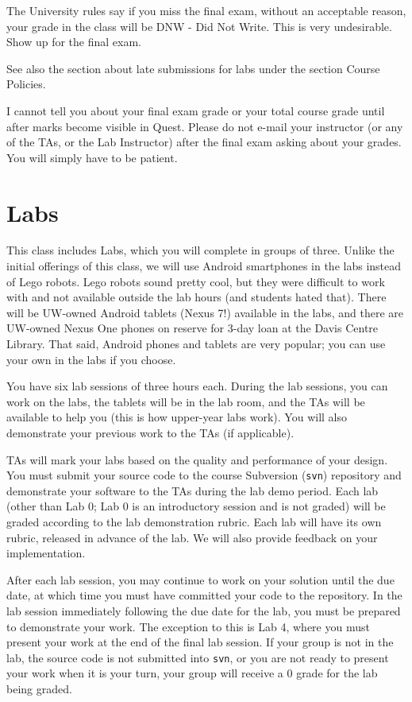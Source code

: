 \documentclass[letterpaper,10pt]{article}
\begin{document}
The University rules say if you miss the final exam, without an acceptable reason, your grade in the class will be DNW - Did Not Write. This is very undesirable. Show up for the final exam.

See also the section about late submissions for labs under the section Course Policies.

I cannot tell you about your final exam grade or your total course grade until after marks become visible in Quest. Please do not e-mail your instructor (or any of the TAs, or the Lab Instructor) after the final exam asking about your grades. You will simply have to be patient.


\section*{Labs}
This class includes Labs, which you will complete in groups of three. Unlike the initial offerings of this class, we will use Android smartphones in the labs instead of Lego robots. Lego robots sound pretty cool, but they were difficult to work with and not available outside the lab hours (and students hated that). There will be UW-owned Android tablets (Nexus 7!) available in the labs, and there are UW-owned Nexus One phones on reserve for 3-day loan at the Davis Centre Library. That said, Android phones and tablets are very popular; you can use your own in the labs if you choose.

You have six lab sessions of three hours each. During the lab sessions, you can work on the labs, the tablets will be in the lab room, and the TAs will be available to help you (this is how upper-year labs work). You will also demonstrate your previous work to the TAs (if applicable).

TAs will mark your labs based on the quality and performance of your design. You must submit your source code to the course Subversion (\texttt{svn}) repository and demonstrate your software to the TAs during the lab demo period. Each lab (other than Lab 0; Lab 0 is an introductory session and is not graded) will be graded according to the lab demonstration rubric. Each lab will have its own rubric, released in advance of the lab. We will also provide feedback on your implementation.

After each lab session, you may continue to work on your solution until the due date, at which time you must have committed your code to the repository. In the lab session immediately following the due date for the lab, you must be prepared to demonstrate your work. The exception to this is Lab 4, where you must present your work at the end of the final lab session.  If your group is not in the lab, the source code is not submitted into \texttt{svn}, or you are not ready to present your work when it is your turn, your group will receive a 0 grade for the lab being graded.
\end{document}
